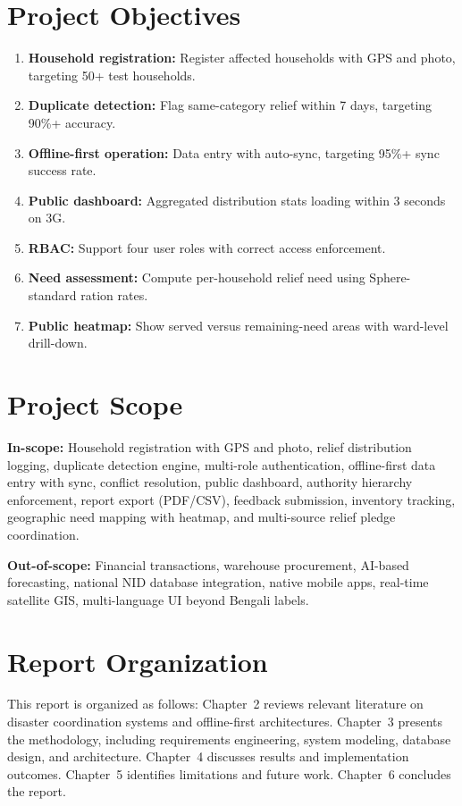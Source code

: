 \section{Project Objectives}

\begin{enumerate}
    \item \textbf{Household registration:} Register affected households with GPS and photo, targeting 50+ test households.
    \item \textbf{Duplicate detection:} Flag same-category relief within 7 days, targeting 90\%+ accuracy.
    \item \textbf{Offline-first operation:} Data entry with auto-sync, targeting 95\%+ sync success rate.
    \item \textbf{Public dashboard:} Aggregated distribution stats loading within 3 seconds on 3G.
    \item \textbf{RBAC:} Support four user roles with correct access enforcement.
    \item \textbf{Need assessment:} Compute per-household relief need using Sphere-standard ration rates.
    \item \textbf{Public heatmap:} Show served versus remaining-need areas with ward-level drill-down.
\end{enumerate}

\section{Project Scope}

\textbf{In-scope:} Household registration with GPS and photo, relief distribution logging, duplicate detection engine, multi-role authentication, offline-first data entry with sync, conflict resolution, public dashboard, authority hierarchy enforcement, report export (PDF/CSV), feedback submission, inventory tracking, geographic need mapping with heatmap, and multi-source relief pledge coordination.

\textbf{Out-of-scope:} Financial transactions, warehouse procurement, AI-based forecasting, national NID database integration, native mobile apps, real-time satellite GIS, multi-language UI beyond Bengali labels.

\section{Report Organization}

This report is organized as follows: Chapter~2 reviews relevant literature on disaster coordination systems and offline-first architectures. Chapter~3 presents the methodology, including requirements engineering, system modeling, database design, and architecture. Chapter~4 discusses results and implementation outcomes. Chapter~5 identifies limitations and future work. Chapter~6 concludes the report.

